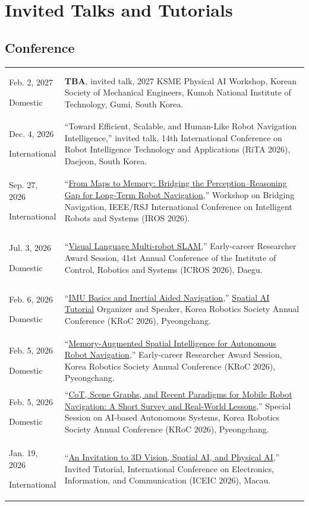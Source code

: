 \documentclass[10pt,a4paper]{article}
\makeatletter
\newcommand{\daterow}[2]{#1 & #2 \\[2.2pt]}
\newcommand{\talkcategory}[1]{\titlespacing*{\subsection}{0pt}{4pt}{1pt}\Needspace{5\baselineskip}\subsection{#1}}
\newcommand{\talkbadge}[1]{%
  {\setlength{\fboxsep}{2pt}\sffamily\scriptsize
  \ifstrequal{#1}{International}{\colorbox{internationalbg}{\textcolor{internationaltext}{#1}}}{%
    \ifstrequal{#1}{DGIST}{\colorbox{internationalbg}{\textcolor{internationaltext}{#1}}}{\colorbox{domesticbg}{#1}}}}%
}
\newcommand{\talkrow}[3]{#1\par\vspace{1pt}\talkbadge{#2} & #3 \\[2pt]}
\newenvironment{talktable}{%
  \small
  \renewcommand{\daterow}[2]{##1 & ##2 \\[0.4pt]}%
  \setlength{\LTpre}{2pt}%
  \setlength{\LTpost}{2pt}%
  \begin{longtable}{@{}L{32mm}L{135mm}@{}}
}{\end{longtable}}
\makeatother
\begin{document}
\section{Invited Talks and Tutorials}
\talkcategory{Conference}
\begin{talktable}
\talkrow{Feb. 2, 2027}{Domestic}{\textbf{TBA}, invited talk, 2027 KSME Physical AI Workshop, Korean Society of Mechanical Engineers, Kumoh National Institute of Technology, Gumi, South Korea.}
\talkrow{Dec. 4, 2026}{International}{``Toward Efficient, Scalable, and Human-Like Robot Navigation Intelligence,'' invited talk, 14th International Conference on Robot Intelligence Technology and Applications (RiTA 2026), Daejeon, South Korea.}
\talkrow{Sep. 27, 2026}{International}{``\href{https://gisbi-kim.github.io/iros26-bridging-navigation-talk}{From Maps to Memory: Bridging the Perception--Reasoning Gap for Long-Term Robot Navigation},'' Workshop on Bridging Navigation, IEEE/RSJ International Conference on Intelligent Robots and Systems (IROS 2026).}
\talkrow{Jul. 3, 2026}{Domestic}{``\href{https://www.dropbox.com/scl/fi/zxwqqnc6hw6c74a0ww6cp/20260703-ICROS2026.pdf?rlkey=mcedth1cutmqcdnsyc1gtj5wy\&dl=0}{Visual Language Multi-robot SLAM},'' Early-career Researcher Award Session, 41st Annual Conference of the Institute of Control, Robotics and Systems (ICROS 2026), Daegu.}
\talkrow{Feb. 6, 2026}{Domestic}{``\href{http://dropbox.com/scl/fi/1f8outhp6bywypygxbsn5/20260206-Kroc-2026-IMU-Basics-and-Inertial-Aided-Navigation.pptx?rlkey=qpyqft9cgxx5vzkccb6x4pp0x\&dl=0}{IMU Basics and Inertial Aided Navigation},'' \href{https://sites.google.com/view/kroc26-spatial-ai-tutorial/home}{Spatial AI Tutorial} Organizer and Speaker, Korea Robotics Society Annual Conference (KRoC 2026), Pyeongchang.}
\talkrow{Feb. 5, 2026}{Domestic}{``\href{https://www.dropbox.com/scl/fi/6ccku80b4dlmgexg7y3e8/20260205-Kroc-2026-Giseop-Kim-sinjin.pptx?rlkey=3x0mtdfwjbu47l7cbk2w30fhk\&e=1\&dl=0}{Memory-Augmented Spatial Intelligence for Autonomous Robot Navigation},'' Early-career Researcher Award Session, Korea Robotics Society Annual Conference (KRoC 2026), Pyeongchang.}
\talkrow{Feb. 5, 2026}{Domestic}{``\href{https://www.dropbox.com/scl/fi/hhu6kb2utuommt3jfagcw/20260205-Kroc-2026-Giseop-Kim-TA3-Special-session.pptx?rlkey=31k2j9bnfrgptxmhkt2pb161a\&e=1\&dl=0}{CoT, Scene Graphs, and Recent Paradigms for Mobile Robot Navigation: A Short Survey and Real-World Lessons},'' Special Session on AI-based Autonomous Systems, Korea Robotics Society Annual Conference (KRoC 2026), Pyeongchang.}
\talkrow{Jan. 19, 2026}{International}{``\href{https://www.dropbox.com/scl/fi/2aw69i4tv6ai6soddxbyu/20260118-slam-tutorial-iceic-giseop-kim.pptx?rlkey=txily56tuzntvnxlt99r5whtb\&e=1\&dl=0}{An Invitation to 3D Vision, Spatial AI, and Physical AI},'' Invited Tutorial, International Conference on Electronics, Information, and Communication (ICEIC 2026), Macau.}

\end{talktable}
\end{document}
